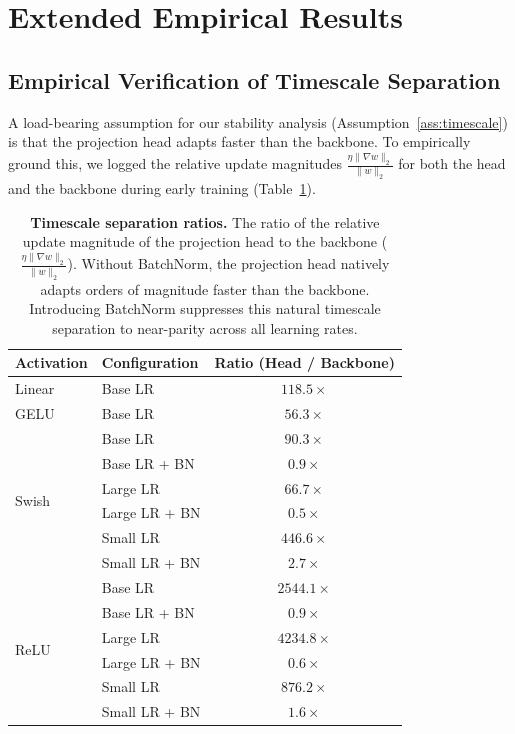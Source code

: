 \documentclass{article}
\theoremstyle{plain}
\theoremstyle{definition}
\theoremstyle{remark}
\begin{document}
\section{Extended Empirical Results}
\label{app:extra-results}

\subsection{Empirical Verification of Timescale Separation}
\label{app:timescale-empirical}
A load-bearing assumption for our stability analysis (Assumption~\ref{ass:timescale}) is that the projection head adapts faster than the backbone. To empirically ground this, we logged the relative update magnitudes $\frac{\eta \|\nabla w\|_2}{\|w\|_2}$ for both the head and the backbone during early training (Table~\ref{tab:timescale-ratios}). 

\begin{table}[ht]
\centering
\scriptsize
\caption{\textbf{Timescale separation ratios.} The ratio of the relative update magnitude of the projection head to the backbone ($\frac{\eta \|\nabla w\|_2}{\|w\|_2}$). Without BatchNorm, the projection head natively adapts orders of magnitude faster than the backbone. Introducing BatchNorm suppresses this natural timescale separation to near-parity across all learning rates.}
\label{tab:timescale-ratios}
\begin{tabular}{llc}
\toprule
\textbf{Activation} & \textbf{Configuration} & \textbf{Ratio (Head / Backbone)} \\ 
\midrule
Linear              & Base LR                & $118.5\times$ \\
GELU                & Base LR                & $56.3\times$ \\
\midrule
\multirow{6}{*}{Swish} 
                    & Base LR                & $90.3\times$ \\
                    & Base LR + BN           & $0.9\times$ \\
                    & Large LR               & $66.7\times$ \\
                    & Large LR + BN          & $0.5\times$ \\
                    & Small LR               & $446.6\times$ \\
                    & Small LR + BN          & $2.7\times$ \\
\midrule
\multirow{6}{*}{ReLU}  
                    & Base LR                & $2544.1\times$ \\
                    & Base LR + BN           & $0.9\times$ \\
                    & Large LR               & $4234.8\times$ \\
                    & Large LR + BN          & $0.6\times$ \\
                    & Small LR               & $876.2\times$ \\
                    & Small LR + BN          & $1.6\times$ \\
\bottomrule
\end{tabular}
\end{table}
\end{document}
